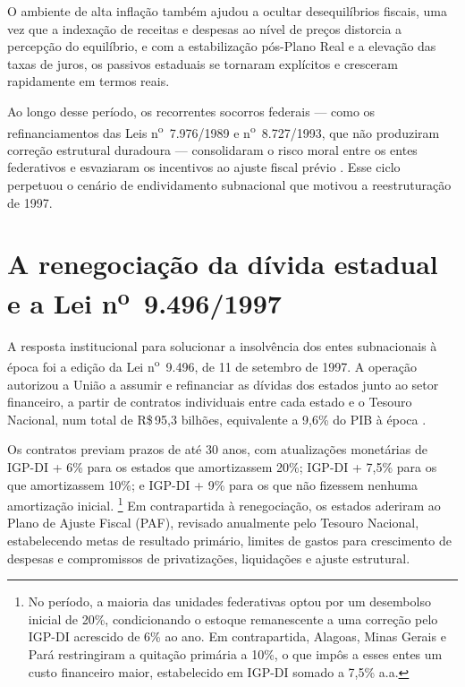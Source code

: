 O ambiente de alta inflação também ajudou a ocultar desequilíbrios fiscais, uma vez que a indexação de receitas e despesas ao nível de preços distorcia a percepção do equilíbrio, e com a estabilização pós-Plano Real e a elevação das taxas de juros, os passivos estaduais se tornaram explícitos e cresceram rapidamente em termos reais.

Ao longo desse período, os recorrentes socorros federais --- como os refinanciamentos das Leis n\textsuperscript{o}~7.976/1989 e n\textsuperscript{o}~8.727/1993, que não produziram correção estrutural duradoura --- consolidaram o risco moral entre os entes federativos e esvaziaram os incentivos ao ajuste fiscal prévio \cite{moraFederalismoEndividamentoSubnacional2007}. Esse ciclo perpetuou o cenário de endividamento subnacional que motivou a reestruturação de 1997.

\section{A renegociação da dívida estadual e a Lei n\textsuperscript{o}~9.496/1997}
\label{sec:lei9496}

A resposta institucional para solucionar a insolvência dos entes subnacionais à época foi a edição da Lei n\textsuperscript{o}~9.496, de 11 de setembro de 1997. A operação autorizou a União a assumir e refinanciar as dívidas dos estados junto ao setor financeiro, a partir de contratos individuais entre cada estado e o Tesouro Nacional, num total de R\$\,95,3 bilhões, equivalente a 9,6\% do PIB à época \cite{NovaRenegociacaoDivida2024}.

Os contratos previam prazos de até 30 anos, com atualizações monetárias de IGP-DI + 6\% para os estados que amortizassem 20\%; IGP-DI + 7,5\% para os que amortizassem 10\%; e IGP-DI + 9\% para os que não fizessem nenhuma amortização inicial. \footnote{No período, a maioria das unidades federativas optou por um desembolso inicial de 20\%, condicionando o estoque remanescente a uma correção pelo IGP-DI acrescido de 6\% ao ano. Em contrapartida, Alagoas, Minas Gerais e Pará restringiram a quitação primária a 10\%, o que impôs a esses entes um custo financeiro maior, estabelecido em IGP-DI somado a 7,5\% a.a.} Em contrapartida à renegociação, os estados aderiram ao Plano de Ajuste Fiscal (PAF), revisado anualmente pelo Tesouro Nacional, estabelecendo metas de resultado primário, limites de gastos para crescimento de despesas e compromissos de privatizações, liquidações e ajuste estrutural.

